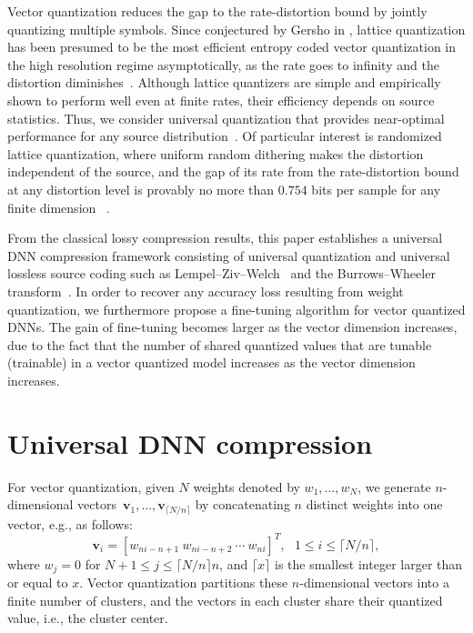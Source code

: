 \documentclass{article}
\theoremstyle{remark}
\begin{document}
Vector quantization reduces the gap to the rate-distortion bound by jointly quantizing multiple symbols. Since conjectured by Gersho in \cite{gersho1979asymptotically}, lattice quantization has been presumed to be the most efficient entropy coded vector quantization in the high resolution regime asymptotically, as the rate goes to infinity and the distortion diminishes~\cite{gray1998quantization}. Although lattice quantizers are simple and empirically shown to perform well even at finite rates, their efficiency depends on source statistics. Thus, we consider universal quantization that provides near-optimal performance for any source distribution~\cite{ziv1985universal}. Of particular interest is randomized lattice quantization, where uniform random dithering makes the distortion independent of the source, and the gap of its rate from the rate-distortion bound at any distortion level is provably no more than $0.754$ bits per sample for any finite dimension%
~\cite{zamir1992universal}.

From the classical lossy compression results, this paper establishes a universal DNN compression framework consisting of universal quantization and universal lossless source coding such as Lempel--Ziv--Welch~\cite{ziv1977universal,ziv1978compression,welch1984technique} and the Burrows--Wheeler transform~\cite{effros2002universal,seward1998bzip2}. In order to recover any accuracy loss resulting from weight quantization, we furthermore propose a fine-tuning algorithm for vector quantized DNNs. The gain of fine-tuning becomes larger as the vector dimension increases, due to the fact that the number of shared quantized values that are tunable (trainable) in a vector quantized model increases as the vector dimension increases.

\section{Universal DNN compression} \label{sec:unq}

For vector quantization, given $N$ weights denoted by $w_1,\dots,w_N$, we generate $n$-dimensional vectors~$\mathbf{v}_1,\dots,\mathbf{v}_{\lceil N/n\rceil}$ by concatenating $n$ distinct weights into one vector, e.g., as follows:
\begin{equation} \label{sec:unq:eq:01}
\mathbf{v}_i=[w_{ni-n+1}\ w_{ni-n+2}\ \cdots\ w_{ni}]^T,
\ \ \
1\leq i\leq\lceil N/n\rceil,
\end{equation}
where $w_j=0$ for $N+1\leq j\leq\lceil N/n\rceil n$, and $\lceil x\rceil$ is the smallest integer larger than or equal to $x$. Vector quantization partitions these $n$-dimensional vectors into a finite number of clusters, and the vectors in each cluster share their quantized value, i.e., the cluster center.
\end{document}
